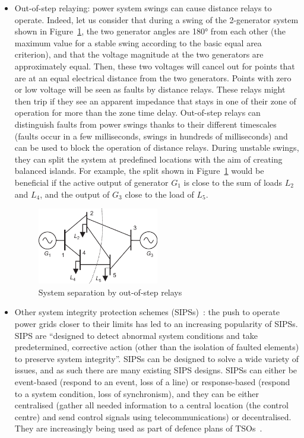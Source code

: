 \begin{itemize}
\begin{itemize}
        \item Out-of-step relaying: power system swings can cause distance relays to operate. Indeed, let us consider that during a swing of the 2-generator system shown in Figure~\ref{fig:OOS}, the two generator angles are 180° from each other (the maximum value for a stable swing according to the basic equal area criterion), and that the voltage magnitude at the two generators are approximately equal. Then, these two voltages will cancel out for points that are at an equal electrical distance from the two generators. Points with zero or low voltage will be seen as faults by distance relays. These relays might then trip if they see an apparent impedance that stays in one of their zone of operation for more than the zone time delay. Out-of-step relays can distinguish faults from power swings thanks to their different timescales (faults occur in a few milliseconds, swings in hundreds of milliseconds) and can be used to block the operation of distance relays. During unstable swings, they can split the system at predefined locations with the aim of creating balanced islands. For example, the split shown in Figure~\ref{fig:OOS} would be beneficial if the active output of generator \(G_1\) is close to the sum of loads \(L_2\) and \(L_4\), and the output of \(G_3\) close to the load of \(L_5\).
        \begin{figure}
            \centering
            \includegraphics[width = 0.5\textwidth]{Figs/Out_of_step.pdf}
            \caption{System separation by out-of-step relays~\cite{HorowitzBook}}
            \label{fig:OOS}
        \end{figure}
        \item Other system integrity protection schemes (SIPSs)~\cite{IEEE_SIPS, CIGRE_SIPS_tutorial}: the push to operate power grids closer to their limits has led to an increasing popularity of SIPSs. SIPS are ``designed to detect abnormal system conditions and take predetermined, corrective action (other than the isolation of faulted elements) to preserve system integrity''. SIPSs can be designed to solve a wide variety of issues, and as such there are many existing SIPS designs. SIPSs can either be event-based (respond to an event, \eg loss of a line) or response-based (respond to a system condition, \eg loss of synchronism), and they can be either centralised (gather all needed information to a central location (\eg the control centre) and send control signals using telecommunications) or decentralised. They are increasingly being used as part of defence plans of TSOs~\cite{CigreDefensePlan, ENTSOEdefencePlan}.
    \end{itemize}
\end{itemize}



